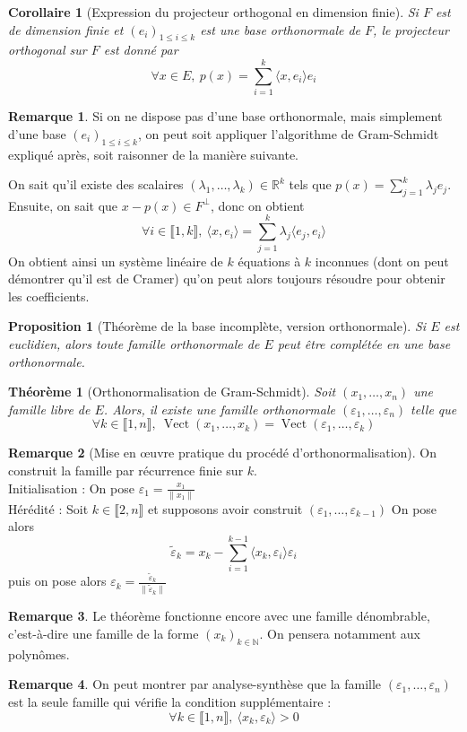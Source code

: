 \documentclass[french]{book}
\newcommand{\N}{\mathbb{N}}
\newcommand{\R}{\mathbb{R}}
\theoremstyle{plain}
\newtheorem{thm}{Théorème}[chapter]
\newtheorem{prop}{Proposition}[chapter]
\newtheorem{cor}{Corollaire}[chapter]
\theoremstyle{definition}
\newtheorem{rmq}{Remarque}[chapter]
\theoremstyle{remark}
\DeclareMathOperator{\vect}{Vect}
\begin{document}
\begin{cor}[Expression du projecteur orthogonal en dimension finie]
	Si $F$ est de dimension finie et $(e_i)_{1\leqslant i\leqslant k}$ est une base orthonormale de $F$, le projecteur orthogonal sur $F$ est donné par $$\forall x\in E,\ p(x)=\sum_{i=1}^{k}\langle x,e_i\rangle e_i$$
\end{cor}
\begin{rmq} Si on ne dispose pas d'une base orthonormale, mais simplement d'une base $(e_i)_{1\leqslant i\leqslant k}$, on peut soit appliquer l'algorithme de Gram-Schmidt expliqué après, soit raisonner de la manière suivante. \end{rmq}
\par On sait qu'il existe des scalaires $(\lambda_1,\ldots,\lambda_k)\in\R^k$ tels que $\displaystyle p(x)=\sum_{j=1}^{k}\lambda_je_j$. Ensuite, on sait que $x-p(x)\in F^\perp$, donc on obtient $$\forall i\in\llbracket1,k\rrbracket,\ \langle x,e_i\rangle = \sum_{j=1}^{k}\lambda_j\langle e_j,e_i\rangle$$ On obtient ainsi un système linéaire de $k$ équations à $k$ inconnues (dont on peut démontrer qu'il est de Cramer) qu'on peut alors toujours résoudre pour obtenir les coefficients.
\begin{prop}[Théorème de la base incomplète, version orthonormale]
	Si $E$ est euclidien, alors toute famille orthonormale de $E$ peut être complétée en une base orthonormale.
\end{prop}
\begin{thm}[Orthonormalisation de Gram-Schmidt]
	Soit $(x_1,\ldots,x_n)$ une famille libre de $E$. Alors, il existe une famille orthonormale $(\varepsilon_1,\ldots,\varepsilon_n)$ telle que $$\forall k\in\llbracket1,n\rrbracket,\ \vect(x_1,\ldots,x_k)=\vect(\varepsilon_1,\ldots,\varepsilon_k)$$
\end{thm}
\begin{rmq}[Mise en œuvre pratique du procédé d'orthonormalisation] On construit la famille par récurrence finie sur $k$. \\ Initialisation : On pose $\displaystyle \varepsilon_1=\frac{x_1}{\lVert x_1\rVert}$ \\ Hérédité : Soit $k\in\llbracket2,n\rrbracket$ et supposons avoir construit $(\varepsilon_1,\ldots,\varepsilon_{k-1})$ On pose alors $$\tilde{\varepsilon}_k=x_k-\sum_{i=1}^{k-1}\langle x_k,\varepsilon_i\rangle\varepsilon_i$$ puis on pose alors $\displaystyle \varepsilon_k=\frac{\tilde{\varepsilon}_k}{\lVert \tilde{\varepsilon}_k\rVert}$ \end{rmq}
\begin{rmq} Le théorème fonctionne encore avec une famille dénombrable, c'est-à-dire une famille de la forme $(x_k)_{k\in\N}$. On pensera notamment aux polynômes. \end{rmq}
\begin{rmq} On peut montrer par analyse-synthèse que la famille $(\varepsilon_1,\ldots,\varepsilon_n)$ est la seule famille qui vérifie la condition supplémentaire : $$\forall k\in\llbracket1,n\rrbracket,\ \langle x_k,\varepsilon_k\rangle >0$$ \end{rmq}
\end{document}

